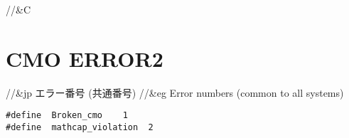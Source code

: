 //&C \section{ CMO ERROR2 }

//&jp エラー番号 (共通番号)
//&eg Error numbers (common to all systems)
\begin{verbatim}
#define  Broken_cmo    1
#define  mathcap_violation  2
\end{verbatim}

